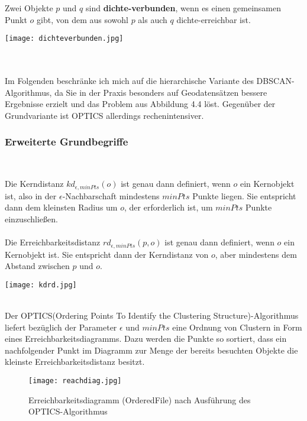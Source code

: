 \documentclass[11pt,ceqn]{book}
\begin{document}
\begin{minipage}{0.6\textwidth}\raggedright
Zwei Objekte $p$ und $q$ sind \textbf{dichte-verbunden}, wenn es einen gemeinsamen Punkt $o$ gibt, von dem aus sowohl $p$ als auch $q$ dichte-erreichbar ist.
\end{minipage}
\hfill
\begin{minipage}{0.3\textwidth}
\texttt{[image: dichteverbunden.jpg]}
\end{minipage}
\\~\\
Im Folgenden beschränke ich mich auf die hierarchische Variante des DBSCAN-Algorithmus, da Sie in der Praxis besonders auf Geodatensätzen bessere Ergebnisse erzielt und das Problem aus Abbildung 4.4 löst. Gegenüber der Grundvariante ist OPTICS allerdings rechenintensiver.

\subsubsection{Erweiterte Grundbegriffe}~
\begin{minipage}{0.50\textwidth}\raggedright
Die Kerndistanz $kd_{\epsilon, minPts}(o)$ ist genau dann definiert, wenn $o$ ein Kernobjekt ist, also in der $\epsilon$-Nachbarschaft mindestens $minPts$ Punkte liegen. Sie entspricht dann dem kleinsten Radius um $o$, der erforderlich ist, um $minPts$ Punkte einzuschließen.\\~\\

Die Erreichbarkeitsdistanz $rd_{\epsilon, minPts}(p ,o)$ ist genau dann definiert, wenn $o$ ein Kernobjekt ist. Sie entspricht dann der Kerndistanz von $o$, aber mindestens dem Abstand zwischen $p$ und $o$.
\end{minipage}
\hfill
\begin{minipage}{0.45\textwidth}
\texttt{[image: kdrd.jpg]}
\end{minipage}
\\
Der OPTICS(Ordering Points To Identify the Clustering Structure)-Algorithmus \cite{optics} liefert bezüglich der Parameter $\epsilon$ und $minPts$ eine Ordnung von Clustern in Form eines Erreichbarkeitsdiagramms. Dazu werden die Punkte so sortiert, dass ein nachfolgender Punkt im Diagramm zur Menge der bereits besuchten Objekte die kleinste Erreichbarkeitsdistanz besitzt.

\begin{figure}[H]
\centering
\texttt{[image: reachdiag.jpg]}
\caption{Erreichbarkeitsdiagramm (OrderedFile) nach Ausführung des OPTICS-Algorithmus\protect\footnotemark}
\end{figure}
\end{document}
